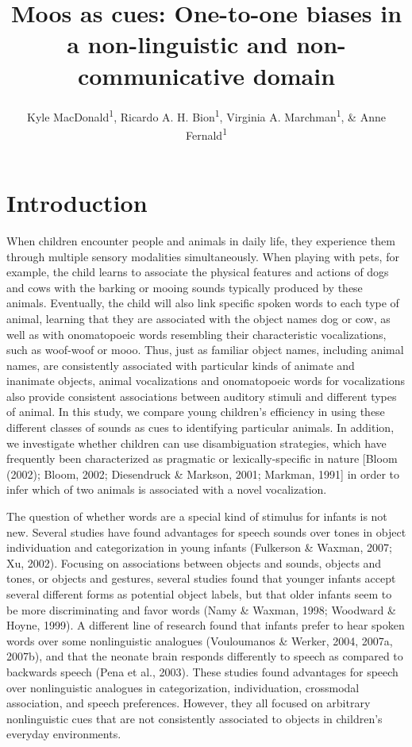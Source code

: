 \documentclass[english,floatsintext,man]{apa6}
\title{Moos as cues: One-to-one biases in a non-linguistic and
non-communicative domain}
\author{Kyle MacDonald\textsuperscript{1}, Ricardo A. H. Bion\textsuperscript{1}, Virginia A. Marchman\textsuperscript{1}, \& Anne Fernald\textsuperscript{1}}
\affiliation{
    \vspace{0.5cm}
          \textsuperscript{1} Stanford University  }
\theoremstyle{definition}
\theoremstyle{definition}
\theoremstyle{definition}
\theoremstyle{remark}
\begin{document}
\maketitle

\setcounter{secnumdepth}{0}



\section{Introduction}\label{introduction}

When children encounter people and animals in daily life, they
experience them through multiple sensory modalities simultaneously. When
playing with pets, for example, the child learns to associate the
physical features and actions of dogs and cows with the barking or
mooing sounds typically produced by these animals. Eventually, the child
will also link specific spoken words to each type of animal, learning
that they are associated with the object names dog or cow, as well as
with onomatopoeic words resembling their characteristic vocalizations,
such as woof-woof or mooo. Thus, just as familiar object names,
including animal names, are consistently associated with particular
kinds of animate and inanimate objects, animal vocalizations and
onomatopoeic words for vocalizations also provide consistent
associations between auditory stimuli and different types of animal. In
this study, we compare young children's efficiency in using these
different classes of sounds as cues to identifying particular animals.
In addition, we investigate whether children can use disambiguation
strategies, which have frequently been characterized as pragmatic or
lexically-specific in nature {[}Bloom (2002); Bloom, 2002; Diesendruck
\& Markson, 2001; Markman, 1991{]} in order to infer which of two
animals is associated with a novel vocalization.

The question of whether words are a special kind of stimulus for infants
is not new. Several studies have found advantages for speech sounds over
tones in object individuation and categorization in young infants
(Fulkerson \& Waxman, 2007; Xu, 2002). Focusing on associations between
objects and sounds, objects and tones, or objects and gestures, several
studies found that younger infants accept several different forms as
potential object labels, but that older infants seem to be more
discriminating and favor words (Namy \& Waxman, 1998; Woodward \& Hoyne,
1999). A different line of research found that infants prefer to hear
spoken words over some nonlinguistic analogues (Vouloumanos \& Werker,
2004, 2007a, 2007b), and that the neonate brain responds differently to
speech as compared to backwards speech (Pena et al., 2003). These
studies found advantages for speech over nonlinguistic analogues in
categorization, individuation, crossmodal association, and speech
preferences. However, they all focused on arbitrary nonlinguistic cues
that are not consistently associated to objects in children's everyday
environments.
\end{document}
